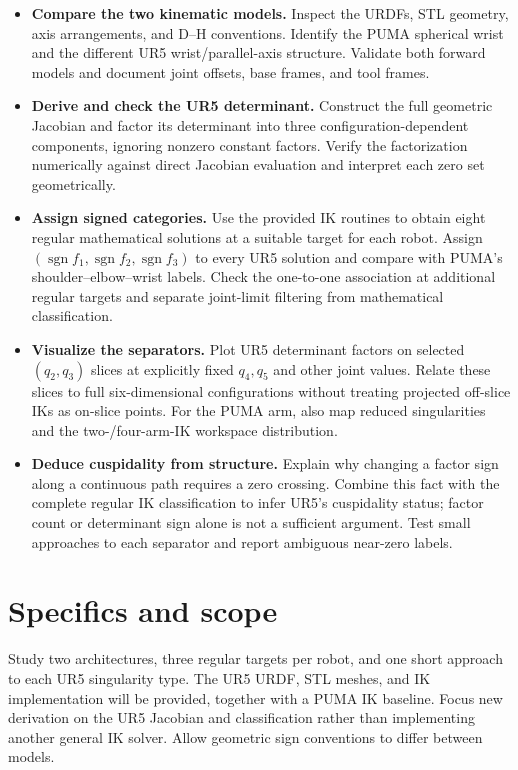 \documentclass[11pt,a4paper]{article}
\begin{document}
\begin{itemize}
  \item \textbf{Compare the two kinematic models.} Inspect the URDFs, STL geometry,
axis arrangements, and D--H conventions. Identify the PUMA spherical wrist and
the different UR5 wrist/parallel-axis structure. Validate both forward models
and document joint offsets, base frames, and tool frames.

  \item \textbf{Derive and check the UR5 determinant.} Construct the full geometric
Jacobian and factor its determinant into three configuration-dependent
components, ignoring nonzero constant factors. Verify the factorization
numerically against direct Jacobian evaluation and interpret each zero set
geometrically.

  \item \textbf{Assign signed categories.} Use the provided IK routines to obtain
eight regular mathematical solutions at a suitable target for each robot.
Assign $(\operatorname{sgn}f_1,\operatorname{sgn}f_2,\operatorname{sgn}f_3)$
to every UR5 solution and compare with PUMA's shoulder--elbow--wrist labels.
Check the one-to-one association at additional regular targets and separate
joint-limit filtering from mathematical classification.

  \item \textbf{Visualize the separators.} Plot UR5 determinant factors on selected
$(q_2,q_3)$ slices at explicitly fixed $q_4,q_5$ and other joint values.
Relate these slices to full six-dimensional configurations without treating
projected off-slice IKs as on-slice points. For the PUMA arm, also map reduced
singularities and the two-/four-arm-IK workspace distribution.

  \item \textbf{Deduce cuspidality from structure.} Explain why changing a factor
sign along a continuous path requires a zero crossing. Combine this fact with
the complete regular IK classification to infer UR5's cuspidality status;
factor count or determinant sign alone is not a sufficient argument. Test
small approaches to each separator and report ambiguous near-zero labels.
\end{itemize}

\newpage
\section*{Specifics and scope}
Study two architectures, three regular targets per robot, and one short
approach to each UR5 singularity type. The UR5 URDF, STL meshes, and IK
implementation will be provided, together with a PUMA IK baseline. Focus new derivation
on the UR5 Jacobian and classification rather than implementing another general
IK solver. Allow geometric sign conventions to differ between models.
\end{document}
